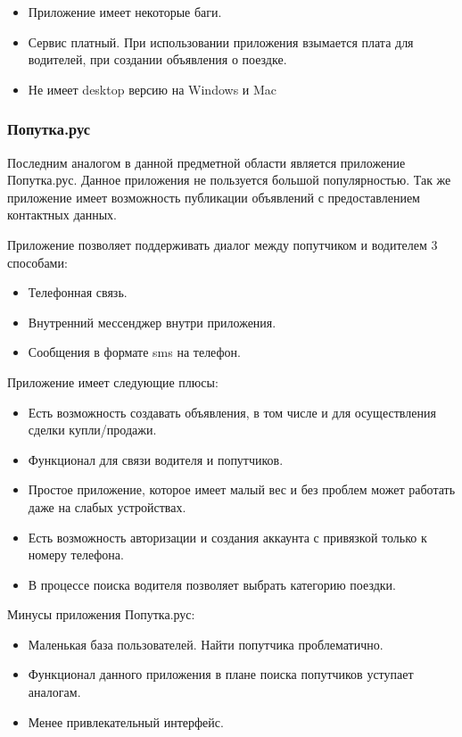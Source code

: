 \begin{itemize}
\item Приложение имеет некоторые баги.
\item Сервис платный. При использовании приложения взымается плата для водителей, при создании объявления о поездке.
\item Не имеет desktop версию на Windows и Mac
\end{itemize}

\subsubsection{Попутка.рус}

Последним аналогом в данной предметной области является приложение Попутка.рус. Данное приложения не пользуется большой популярностью. Так же приложение имеет возможность публикации объявлений с предоставлением контактных данных. 

Приложение позволяет поддерживать диалог между попутчиком и водителем 3 способами:

\begin{itemize}
\item Телефонная связь.
\item Внутренний мессенджер внутри приложения.
\item Сообщения в формате sms на телефон.
\end{itemize}

Приложение имеет следующие плюсы:

\begin{itemize}
\item Есть возможность создавать объявления, в том числе и для осуществления сделки купли/продажи.
\item Функционал для связи водителя и попутчиков.
\item Простое приложение, которое имеет малый вес и без проблем может работать даже на слабых устройствах.
\item Есть возможность авторизации и создания аккаунта с привязкой только к номеру телефона.
\item В процессе поиска водителя позволяет выбрать категорию поездки.
\end{itemize}

Минусы приложения Попутка.рус:

\begin{itemize}
\item Маленькая база пользователей. Найти попутчика проблематично.
\item Функционал данного приложения в плане поиска попутчиков уступает аналогам.
\item Менее привлекательный интерфейс.
\end{itemize}

